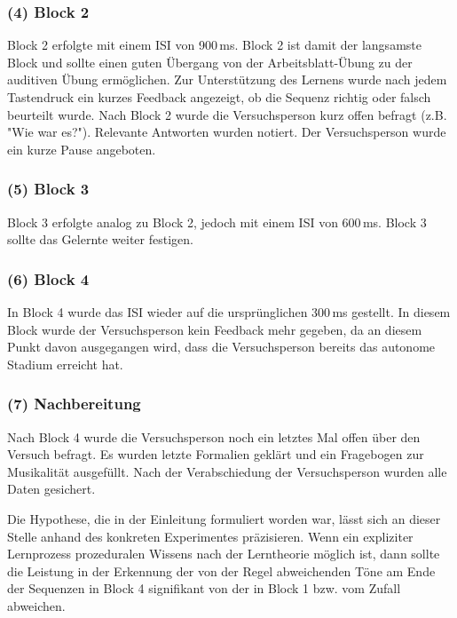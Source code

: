 \documentclass[doc,a4paper,12pt]{apa6}
\begin{document}
\subsubsection{(4) Block 2}

Block 2 erfolgte mit einem ISI von 900\,ms. Block 2 ist damit der langsamste Block und sollte einen guten Übergang von der Arbeitsblatt-Übung zu der auditiven Übung ermöglichen. Zur Unterstützung des Lernens wurde nach jedem Tastendruck ein kurzes Feedback angezeigt, ob die Sequenz richtig oder falsch beurteilt wurde. Nach Block 2 wurde die Versuchsperson kurz offen befragt (z.B. "Wie war es?"). Relevante Antworten wurden notiert. Der Versuchsperson wurde ein kurze Pause angeboten.

\subsubsection{(5) Block 3}

Block 3 erfolgte analog zu Block 2, jedoch mit einem ISI von 600\,ms. Block 3 sollte das Gelernte weiter festigen.

\subsubsection{(6) Block 4}

In Block 4 wurde das ISI wieder auf die ursprünglichen 300\,ms gestellt. In diesem Block wurde der Versuchsperson kein Feedback mehr gegeben, da an diesem Punkt davon ausgegangen wird, dass die Versuchsperson bereits das autonome Stadium erreicht hat.

\subsubsection{(7) Nachbereitung}

Nach Block 4 wurde die Versuchsperson noch ein letztes Mal offen über den Versuch befragt. Es wurden letzte Formalien geklärt und ein Fragebogen zur Musikalität ausgefüllt. Nach der Verabschiedung der Versuchsperson wurden alle Daten gesichert.

Die Hypothese, die in der Einleitung formuliert worden war, lässt sich an dieser Stelle anhand des konkreten Experimentes präzisieren. Wenn ein expliziter Lernprozess prozeduralen Wissens nach der Lerntheorie möglich ist, dann sollte die Leistung in der Erkennung der von der Regel abweichenden Töne am Ende der Sequenzen in Block 4 signifikant von der in Block 1 bzw. vom Zufall abweichen.
\end{document}
